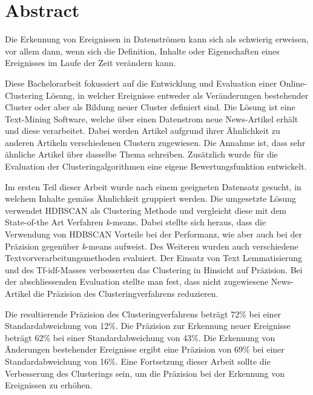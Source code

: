 
\section*{Abstract}

Die Erkennung von Ereignissen in Datenströmen kann sich als schwierig erweisen, vor allem dann,
wenn sich die Definition, Inhalte oder Eigenschaften eines Ereignisses im Laufe der Zeit verändern kann.

Diese Bachelorarbeit fokussiert auf die Entwicklung und Evaluation einer Online-Clustering Lösung,
in welcher Ereignisse entweder als Veränderungen bestehender Cluster oder aber als Bildung neuer Cluster
definiert sind.
Die Lösung ist eine Text-Mining Software, welche über einen Datenstrom neue News-Artikel erhält
und diese verarbeitet.
Dabei werden Artikel aufgrund ihrer Ähnlichkeit zu anderen Artikeln verschiedenen Clustern zugewiesen.
Die Annahme ist, dass sehr ähnliche Artikel über dasselbe Thema schreiben.
Zusätzlich wurde für die Evaluation der Clusteringalgorithmen eine eigene Bewertungsfunktion entwickelt.

Im ersten Teil dieser Arbeit wurde nach einem geeigneten Datensatz gesucht,
in welchem Inhalte gemäss Ähnlichkeit gruppiert werden.
Die umgesetzte Lösung verwendet HDBSCAN als Clustering Methode und vergleicht diese
mit dem State-of-the Art Verfahren \textit{k}-means.
Dabei stellte sich heraus, dass die Verwendung von HDBSCAN Vorteile bei der Performanz,
wie aber auch bei der Präzision gegenüber \textit{k}-means aufweist.
Des Weiteren wurden auch verschiedene Textvorverarbeitungsmethoden evaluiert.
Der Einsatz von Text Lemmatisierung und des Tf-idf-Masses verbesserten
das Clustering in Hinsicht auf Präzision.
Bei der abschliessenden Evaluation stellte man fest,
dass nicht zugewiesene News-Artikel die Präzision des Clusteringverfahrens reduzieren.

Die resultierende Präzision des Clusteringverfahrens beträgt 72\% bei einer Standardabweichung von 12\%.
Die Präzision zur Erkennung neuer Ereignisse beträgt 62\% bei einer Standardabweichung von 43\%.
Die Erkennung von Änderungen bestehender Ereignisse ergibt eine
Präzision von 69\% bei einer Standardabweichung von 16\%.
Eine Fortsetzung dieser Arbeit sollte die Verbesserung des Clusterings sein,
um die Präzision bei der Erkennung von Ereignissen zu erhöhen.
